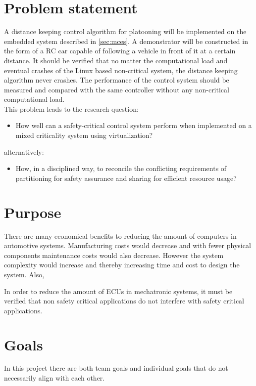 \section{Problem statement}
A distance keeping control algorithm for platooning will be implemented on the embedded system described in \ref{sec:mces}. A demonstrator will be constructed in the form of a RC car capable of following a vehicle in front of it at a certain distance. It should be verified that no matter the computational load and eventual crashes of the Linux based non-critical system, the distance keeping algorithm never crashes. The performance of the control system should be measured and compared with the same controller without any non-critical computational load.\\

This problem leads to the research question: 
\begin{itemize}
\item How well can a safety-critical control system perform when implemented on a mixed criticality system using virtualization?
\end{itemize}
alternatively:
\begin{itemize}
\item How, in a disciplined way, to reconcile the conflicting requirements of partitioning for safety assurance and sharing for efficient resource usage?
\end{itemize}

\section{Purpose}
There are many economical benefits to reducing the amount of computers in automotive systems. Manufacturing costs would decrease and with fewer physical components maintenance costs would also decrease. However the system complexity would increase and thereby increasing time and cost to design the system. Also,

In order to reduce the amount of ECUs in mechatronic systems, it must be verified that non safety critical applications do not interfere with safety critical applications.

\section{Goals}
In this project there are both team goals and individual goals that do not necessarily align with each other. 

